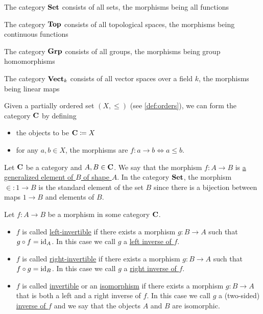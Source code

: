 \begin{definition}\label{def:standard_categories}
  \begin{defenum}
    \item\label{def:standard_categories/set} The category $\operatorname{\mathbf{Set}}$ consists of all sets, the morphisms being all functions
    \item\label{def:standard_categories/top} The category $\operatorname{\mathbf{Top}}$ consists of all topological spaces, the morphisms being continuous functions
    \item\label{def:standard_categories/grp} The category $\operatorname{\mathbf{Grp}}$ consists of all groups, the morphisms being group homomorphisms
    \item\label{def:standard_categories/vect} The category $\operatorname{\mathbf{Vect}}_k$ consists of all vector spaces over a field $k$, the morphisms being linear maps
    \item\label{def:standard_categories/ord} Given a partially ordered set $(X, \leq)$ (see \cref{def:orders}), we can form the category $\operatorname{\mathbf{C}}$ by defining
    \begin{itemize}
      \item the objects to be $\operatorname{\mathbf{C}} \coloneqq X$
      \item for any $a, b \in X$, the morphisms are $f: a \to b \iff a \leq b$.
    \end{itemize}
  \end{defenum}
\end{definition}

\begin{definition}\label{def:generalized_element}\cite[definition 4.1.25]{Leinster2014}
  Let $\operatorname{\mathbf{C}}$ be a category and $A, B \in \operatorname{\mathbf{C}}$. We say that the morphism $f: A \to B$ is \uline{a generalized element of $B$ of shape $A$}. In the category $\operatorname{\mathbf{Set}}$, the morphism $\in : 1 \to B$ is the standard element of the set $B$ since there is a bijection between maps $1 \to B$ and elements of $B$.
\end{definition}

\begin{definition}\label{def:morphism_invertability}
  Let $f: A \to B$ be a morphism in some category $\operatorname{\mathbf{C}}$.

  \begin{itemize}
    \item $f$ is called \uline{left-invertible} if there exists a morphism $g: B \to A$ such that $g \circ f = \operatorname{id}_A$. In this case we call $g$ a \uline{left inverse of $f$}.

    \item $f$ is called \uline{right-invertible} if there exists a morphism $g: B \to A$ such that $f \circ g = \operatorname{id}_B$. In this case we call $g$ a \uline{right inverse of $f$}.

    \item $f$ is called \uline{invertible} or an \uline{isomorphism} if there exists a morphism $g: B \to A$ that is both a left and a right inverse of $f$. In this case we call $g$ a (two-sided) \uline{inverse of $f$} and we say that the objects $A$ and $B$ are isomorphic.
  \end{itemize}
\end{definition}

